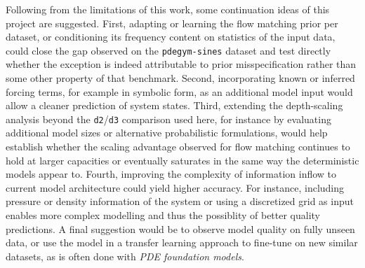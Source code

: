 Following from the limitations of this work, some continuation ideas of this project are suggested. First, adapting or learning the flow matching prior per dataset, or conditioning its frequency content on statistics of the input data, could close the gap observed on the \texttt{pdegym-sines} dataset and test directly whether the exception is indeed attributable to prior misspecification rather than some other property of that benchmark. Second, incorporating known or inferred forcing terms, for example in symbolic form, as an additional model input would allow a cleaner prediction of system states. Third, extending the depth-scaling analysis beyond the \texttt{d2}/\texttt{d3} comparison used here, for instance by evaluating additional model sizes or alternative probabilistic formulations, would help establish whether the scaling advantage observed for flow matching continues to hold at larger capacities or eventually saturates in the same way the deterministic models appear to. Fourth, improving the complexity of information inflow to current model architecture could yield higher accuracy. For instance, including pressure or density information of the system or using a discretized grid as input enables more complex modelling and thus the possiblity of better quality predictions. A final suggestion would be to observe model quality on fully unseen data, or use the model in a transfer learning approach to fine-tune on new similar datasets, as is often done with \textit{PDE foundation models}.
